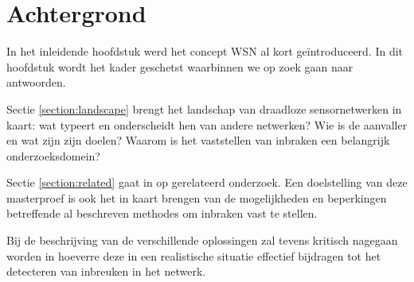 
\chapter{Achtergrond}
\label{chapter:achtergrond}

In het inleidende hoofdstuk werd het concept WSN al kort ge\"introduceerd. In
dit hoofdstuk wordt het kader geschetst waarbinnen we op zoek gaan naar
antwoorden.

Sectie \ref{section:landscape} brengt het landschap van draadloze
sensornetwerken in kaart: wat typeert en onderscheidt hen van andere netwerken?
Wie is de aanvaller en wat zijn zijn doelen? Waarom is het vaststellen van
inbraken een belangrijk onderzoeksdomein?

Sectie \ref{section:related} gaat in op gerelateerd onderzoek. Een doelstelling
van deze masterproef is ook het in kaart brengen van de mogelijkheden en
beperkingen betreffende al beschreven methodes om inbraken vast te stellen.

Bij de beschrijving van de verschillende oplossingen zal tevens kritisch
nagegaan worden in hoeverre deze in een realistische situatie effectief
bijdragen tot het detecteren van inbreuken in het netwerk.




